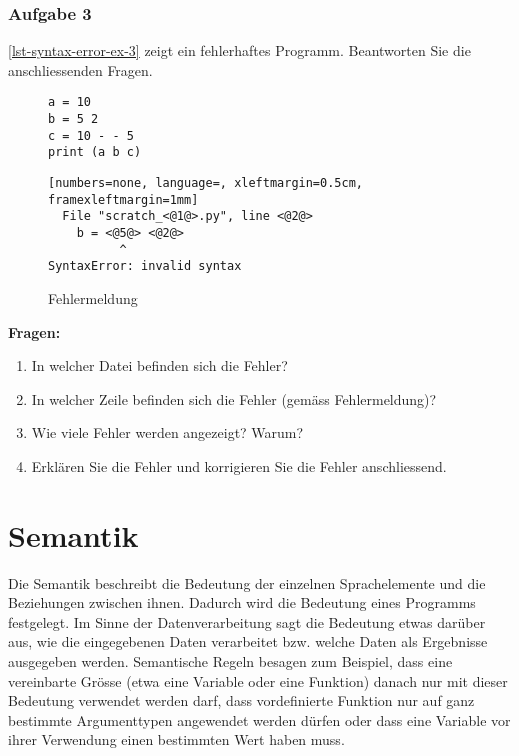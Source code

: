 \subsubsection{Aufgabe 3}

\autoref{lst-syntax-error-ex-3} zeigt ein fehlerhaftes Programm. Beantworten Sie die anschliessenden Fragen.

\begin{figure}[htb]
\centering
\begin{minipage}{0.35\linewidth}
\centering
\begin{lstlisting}[caption={Das Programm hat zwei Syntaxfehler.}, label=lst-syntax-error-ex-3, showstringspaces=false]
a = 10
b = 5 2
c = 10 - - 5
print (a b c)
\end{lstlisting}
\end{minipage}
\hfill
\begin{minipage}{0.6\linewidth}
\centering
\begin{lstlisting}[numbers=none, language=, xleftmargin=0.5cm, framexleftmargin=1mm]
  File "scratch_<@1@>.py", line <@2@>
    b = <@5@> <@2@>
          ^
SyntaxError: invalid syntax
\end{lstlisting}
\caption{Fehlermeldung}
\label{lst-syntax-error-ex-3-output}
\end{minipage}
\end{figure}

\textbf{Fragen:}

\begin{enumerate}
\item In welcher Datei befinden sich die Fehler?
\item In welcher Zeile befinden sich die Fehler (gemäss Fehlermeldung)?
\item Wie viele Fehler werden angezeigt? Warum?
\item Erklären Sie die Fehler und korrigieren Sie die Fehler anschliessend.
\end{enumerate}

\section{Semantik}

Die Semantik beschreibt die Bedeutung der einzelnen Sprachelemente und die Beziehungen zwischen ihnen. Dadurch wird die Bedeutung eines Programms festgelegt. Im Sinne der Datenverarbeitung sagt die Bedeutung etwas darüber aus, wie die eingegebenen Daten verarbeitet bzw. welche Daten als Ergebnisse ausgegeben werden. Semantische Regeln besagen zum Beispiel, dass eine vereinbarte Grösse (etwa eine Variable oder eine Funktion) danach nur mit dieser Bedeutung verwendet werden darf, dass vordefinierte Funktion nur auf ganz bestimmte Argumenttypen angewendet werden dürfen oder dass eine Variable vor ihrer Verwendung einen bestimmten Wert haben muss.

